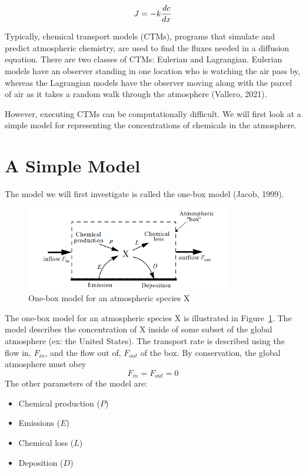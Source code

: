 \documentclass{article}
\begin{document}
\begin{equation}
    J = -k \* \frac{dc}{dx}
\end{equation}

Typically, chemical transport models (CTMs), programs that simulate and predict atmospheric chemistry, are used to find the fluxes needed in a diffusion equation. 
There are two classes of CTMs: Eulerian and Lagrangian. Eulerian models have an observer standing in one location who is watching the air pass by, 
whereas the Lagrangian models have the observer moving along with the parcel of air as it takes a random walk through the atmosphere (Vallero, 2021).

However, executing CTMs can be computationally difficult. We will first look at a simple model for representing the concentrations of chemicals in the 
atmosphere.

\section{A Simple Model}

The model we will first investigate is called the one-box model (Jacob, 1999).

\begin{figure}[h]
   \centering
   \includegraphics[width=0.8\textwidth]{atmospheric_model.png}
   \caption{One-box model for an atmospheric species X}
   \label{fig:atmospheric_box_model}
\end{figure}

The one-box model for an atmospheric species X is illustrated in Figure~\ref{fig:atmospheric_box_model}. 
The model describes the concentration of X inside of some subset of the global atmosphere (ex: the United States).
The transport rate is described using the flow in, $F_{in}$, and the flow out of, $F_{out}$ of the box. By conservation, the global
atmosphere must obey
$$
    F_{in} = F_{out} = 0
$$
The other parameters of the model are:
\begin{itemize}
   \item Chemical production ($P$)
   \item Emissions ($E$)
   \item Chemical loss ($L$)
   \item Deposition ($D$)
\end{itemize}
\end{document}
